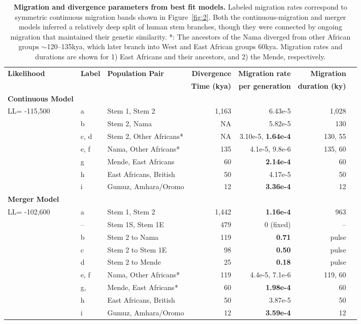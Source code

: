 \documentclass{article}
\begin{document}
\begin{table}[t!]
    \centering
    \scriptsize
    \begin{tabular}{lllrrrr}
        \toprule
        \textbf{Likelihood} & \textbf{Label} & \textbf{Population Pair} &
            \textbf{Divergence} & \textbf{Migration rate} & \textbf{Migration} \\
        & & & 
            \textbf{Time (kya)} & \textbf{per generation} & \textbf{duration (ky)} \\
        \midrule
        \textbf{Continuous Model} & & & & & \\
        LL= -115,500 & a & Stem 1, Stem 2 & 1,163 & 6.43e-5 & 1,028 \\
        & b & Stem 2, Nama & NA & 5.82e-5 & 130 \\
        & c, d & Stem 2, Other Africans* & NA & 3.10e-5, \textbf{1.64e-4} & 130, 55 \\
        & e, f & Nama, Other Africans* & 135 & 4.1e-5, 9.8e-6 & 135, 60 \\
        & g & Mende, East Africans & 60 & \textbf{2.14e-4} & 60 \\
        & h & East Africans, British & 50 & 4.17e-5 & 50 \\
        & i & Gumuz, Amhara/Oromo & 12 &\textbf{3.36e-4} & 12 \\
        \textbf{Merger Model} & & & & & \\
        LL= -102,600 & a & Stem 1, Stem 2 & 1,442 & \textbf{1.16e-4} & 963 \\
        & -- & Stem 1S, Stem 1E & 479 & 0 (fixed) & -- \\
        & b & Stem 2 to Nama & 119 & \textbf{0.71} & pulse \\
        & c & Stem 2 to Stem 1E & 98 & \textbf{0.50} & pulse \\
        & d & Stem 2 to Mende & 25 & \textbf{0.18} & pulse \\
        & e, f & Nama, Other Africans* & 119 & 4.4e-5, 7.1e-6 & 119, 60 \\
        & g, & Mende, East Africans* & 60 & \textbf{1.98e-4} & 60 \\
        & h & East Africans, British & 50 & 3.87e-5 & 50 \\
        & i & Gumuz, Amhara/Oromo &12 & \textbf{3.59e-4} & 12 \\
        \bottomrule
    \end{tabular}
    \caption{
        \textbf{Migration and divergence parameters from best fit models.}
        Labeled migration rates correspond to symmetric continuous migration
        bands shown in Figure~\ref{fig:2}. Both the continuous-migration and
        merger models inferred a relatively deep split of human stem branches,
        though they were connected by ongoing migration that maintained their
        genetic similarity.
        *: The ancestors of the Nama diverged from other African groups
        $\sim$120--135kya, which later branch into West and East African
        groups 60kya. Migration rates and durations are shown for 1) East Africans
        and their ancestors, and 2) the Mende, respectively.
    }
    \label{tab:migration-rates}
\end{table}
\end{document}
